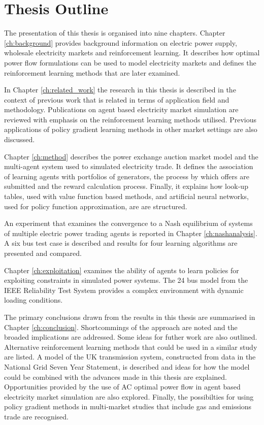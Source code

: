 \section{Thesis Outline}
The presentation of this thesis is organised into nine chapters.  Chapter
\ref{ch:background} provides background information on electric power supply,
wholesale electricity markets and reinforcement learning.  It describes how
optimal power flow formulations can be used to model electricity markets and
defines the reinforcement learning methods that are later examined.

In Chapter \ref{ch:related_work} the research in this thesis is described in
the context of previous work that is related in terms of application field and
methodology.  Publications on agent based electricity market simulation are
reviewed with emphasis on the reinforcement learning methods utilised.
Previous applications of policy gradient learning methods in other market
settings are also discussed.

Chapter \ref{ch:method} describes the power exchange auction market model and
the multi-agent system used to simulated electricity trade.  It defines the
association of learning agents with portfolios of generators, the process by
which offers are submitted and the reward calculation process.  Finally, it
explains how look-up tables, used with value function based methods, and
artificial neural networks, used for policy function approximation, are
are structured.

An experiment that examines the convergence to a Nash equilibrium of systems of
multiple electric power trading agents is reported in Chapter
\ref{ch:nashanalysis}. A six bus test case is described and results for four
learning algorithms are presented and compared.

Chapter \ref{ch:exploitation} examines the ability of agents to learn policies
for exploiting constraints in simulated power systems.  The 24 bus model from
the IEEE Reliability Test System provides a complex environment with dynamic
loading conditions.

The primary conclusions drawn from the results in this thesis are summarised
in Chapter \ref{ch:conclusion}.  Shortcommings of the approach are noted and
the broaded implications are addressed.  Some ideas for futher work are also
outlined.  Alternative reinforcement learning methods that could be used in a
similar study are listed.
A model of the UK transmission system, constructed from data in the National
Grid Seven Year Statement, is described and ideas for how the model could be
combined with the advances made in this thesis are explained.  Opportunities
provided by the use of AC optimal power flow in agent based electricity market
simulation are also explored.  Finally, the possibilties for using policy
gradient methods in multi-market studies that include gas and emissions trade
are recognised.

